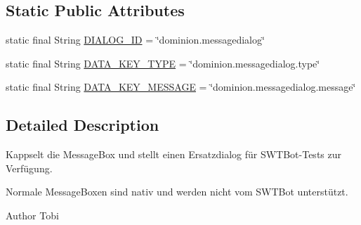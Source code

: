\subsection*{\-Static \-Public \-Attributes}
\begin{DoxyCompactItemize}
\item 
static final \-String \hyperlink{classdominion_1_1view_1_1MessageDialog_a1fd2b79d787f0017faf895629bcd9b78}{\-D\-I\-A\-L\-O\-G\-\_\-\-I\-D} = \char`\"{}dominion.\-messagedialog\char`\"{}
\item 
static final \-String \hyperlink{classdominion_1_1view_1_1MessageDialog_af5f51283fb02b8d881b3bf6944946c7e}{\-D\-A\-T\-A\-\_\-\-K\-E\-Y\-\_\-\-T\-Y\-P\-E} = \char`\"{}dominion.\-messagedialog.\-type\char`\"{}
\item 
static final \-String \hyperlink{classdominion_1_1view_1_1MessageDialog_ab0ca77f2ec94f5405ffd6f3b07464153}{\-D\-A\-T\-A\-\_\-\-K\-E\-Y\-\_\-\-M\-E\-S\-S\-A\-G\-E} = \char`\"{}dominion.\-messagedialog.\-message\char`\"{}
\end{DoxyCompactItemize}


\subsection{\-Detailed \-Description}
\-Kappselt die \-Message\-Box und stellt einen \-Ersatzdialog für \-S\-W\-T\-Bot-\/\-Tests zur \-Verfügung.

\-Normale \-Message\-Boxen sind nativ und werden nicht vom \-S\-W\-T\-Bot unterstützt.

\begin{DoxyAuthor}{\-Author}
\-Tobi 
\end{DoxyAuthor}


